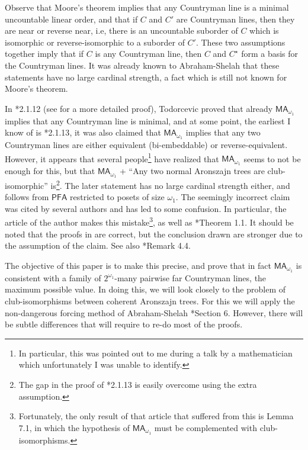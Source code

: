 \documentclass[a4paper,noamsfonts]{amsart}
\theoremstyle{definition}
\newcommand{\PFA}{\textsf{PFA}}
\newcommand{\MA}{\textsf{MA}}
\newcommand{\1}{\mathbf{1}}
\begin{document}
Observe that Moore's theorem implies that any Countryman line is a
minimal uncountable linear order, and that if $C$ and $C'$ are
Countryman lines, then they are near or reverse near, i.e,
there is an uncountable suborder of $C$ which is isomorphic or
reverse-isomorphic to a suborder of $C'$.
These two assumptions together imply that 
if $C$ is any Countryman line, then $C$ and $C^{\star}$
form a basis for the Countryman lines.
It was already known to Abraham-Shelah \cite{ShelahAbraham} that these
statements have no large cardinal strength, a fact which is still not
known for Moore's theorem.

In \cite{TodorcevicWalks}*{2.1.12}
(see \cite{univ-A-line} for a more detailed proof),
Todorcevic proved that
already $\MA_{\omega_{1}}$ implies that any Countryman line
is minimal, and at some point,
the earliest I know of is \cite{TodorcevicWalks}*{2.1.13}, it was
also claimed that $\MA_{\omega_{1}}$ implies that any two Countryman lines
are either equivalent (bi-embeddable) or reverse-equivalent.
However, it appears that several
people\footnote{In particular, this was pointed out to
  me during a talk by a mathematician which unfortunately
  I was unable to identify.}
have realized that $\MA_{\omega_{1}}$ seems to not be enough for this,
but that
$\MA_{\omega_{1}}$ + ``Any two normal Aronszajn trees are club-isomorphic''
is\footnote{The gap in the proof of \cite{TodorcevicWalks}*{2.1.13} is easily
overcome using the extra assumption.}.
The later statement has no large cardinal strength either,
and follows from $\PFA$ restricted to posets of size $\omega_{1}$.
The seemingly incorrect claim was cited by several authors and has
led to some confusion. In particular, the article of the author
\cite{PMREpi} makes this mistake\footnote{Fortunately, the only
  result of that article that suffered from this is
  Lemma 7.1, in which the hypothesis of $\MA_{\omega_{1}}$ must be complemented
  with club-isomorphisms.}, as well as \cite{univ-A-line}*{Theorem 1.1}.
It should be noted that the proofs in \cite{PMREpi,univ-A-line} are correct,
but the conclusion drawn are stronger due to the assumption of the claim.
See also \cite{MooreTodorcevic}*{Remark 4.4}.

The objective of this paper is to make this precise, and prove that in
fact $\MA_{\omega_{1}}$ is consistent with
a family of $2^{\omega_{1}}$-many pairwise far Countryman lines,
the maximum possible value. In
doing this, we will look closely to the problem of club-isomorphisms
between coherent Aronszajn trees.  For this we will apply
the non-dangerous forcing method of Abraham-Shelah
\cite{ShelahAbraham}*{Section 6}. However, there will be subtle differences
that will require to re-do most of the proofs.
\end{document}
